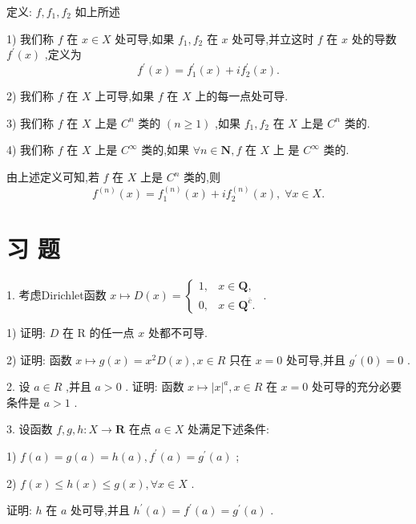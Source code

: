 定义: $f,{f}_{1},{f}_{2}$ 如上所述

1) 我们称 $f$ 在 $x \in  X$ 处可导,如果 ${f}_{1},{f}_{2}$ 在 $x$ 处可导,并立这时 $f$ 在 $x$ 处的导数 ${f}^{\prime }\left( x\right)$ ,定义为
$${f}^{\prime }\left( x\right)  = {f}_{1}^{\prime }\left( x\right)  + i{f}_{2}^{\prime }\left( x\right) .$$

2) 我们称 $f$ 在 $X$ 上可导,如果 $f$ 在 $X$ 上的每一点处可导.

3) 我们称 $f$ 在 $X$ 上是 ${C}^{n}$ 类的 $\left( {n \geq  1}\right)$ ,如果 ${f}_{1},{f}_{2}$ 在 $X$ 上是 ${C}^{n}$ 类的.

4) 我们称 $f$ 在 $X$ 上是 ${C}^{\infty }$ 类的,如果 $\forall n \in  \mathbf{N},f$ 在 $X$ 上 是 ${C}^{\infty }$ 类的.

由上述定义可知,若 $f$ 在 $X$ 上是 ${C}^{n}$ 类的,则
$${f}^{\left( n\right) }\left( x\right)  = {f}_{1}^{\left( n\right) }\left( x\right)  + i{f}_{2}^{\left( n\right) }\left( x\right) ,\;\forall x \in  X.$$

\section*{习 题}

1. 考虑Dirichlet函数 $x \mapsto  D\left( x\right)  = \left\{  \begin{array}{ll} 1, & x \in  \mathbf{Q}, \\  0, & x \in  {\mathbf{Q}}^{\bar{c}}. \end{array}\right.$ .

1) 证明: $D$ 在 $\mathrm{R}$ 的任一点 $x$ 处都不可导.

2) 证明: 函数 $x \mapsto  g\left( x\right)  = {x}^{2}D\left( x\right) ,x \in  R$ 只在 $x = 0$ 处可导,并且 ${g}^{\prime }\left( 0\right)  = 0$ .

2. 设 $a \in  R$ ,并且 $a > 0$ . 证明: 函数 $x \mapsto  {\left| x\right| }^{a},x \in  R$ 在 $x = 0$ 处可导的充分必要条件是 $a > 1$ .

3. 设函数 $f,g,h : X \rightarrow  \mathbf{R}$ 在点 $a \in  X$ 处满足下述条件:

1) $f\left( a\right)  = g\left( a\right)  = h\left( a\right) ,{f}^{\prime }\left( a\right)  = {g}^{\prime }\left( a\right)$ ;

2) $f\left( x\right)  \leq  h\left( x\right)  \leq  g\left( x\right) ,\forall x \in  X$ .

证明: $h$ 在 $a$ 处可导,并且 ${h}^{\prime }\left( a\right)  = {f}^{\prime }\left( a\right)  = {g}^{\prime }\left( a\right)$ .


